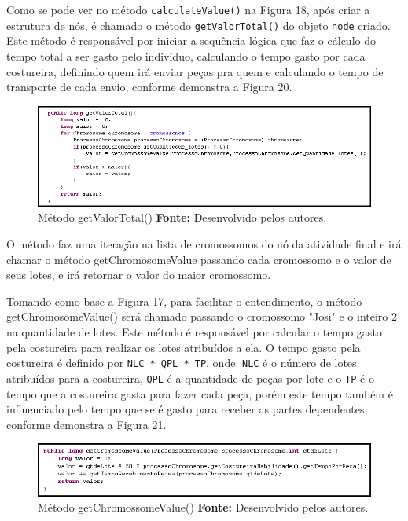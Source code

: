 \par Como se pode ver no método \texttt{calculateValue()} na Figura 18, após
criar a estrutura de nós, é chamado o método \texttt{getValorTotal()} do objeto
\texttt{node} criado. Este método é responsável por iniciar a sequência lógica que faz o cálculo do tempo total a ser gasto pelo indivíduo, calculando o tempo gasto por cada costureira, definindo quem irá enviar
peças pra quem e calculando o tempo de transporte de cada envio, conforme
demonstra a Figura 20.

\begin{figure}[h!]
	\centerline{\includegraphics[scale=0.7]{./imagens/metodo_getValorTotal.png}}
	\caption[Método getValorTotal()]
	{Método getValorTotal() \textbf{Fonte:} Desenvolvido pelos autores.}
	\label{fig:exemplo1}
\end{figure}

\par O método faz uma iteração na lista de cromossomos do nó da atividade final e irá chamar o método getChromosomeValue passando 
cada cromossomo e o valor de seus lotes, e irá retornar o valor do maior cromossomo.

\par Tomando como base a Figura 17, para facilitar o entendimento, o método
getChromosomeValue() será chamado passando o cromossomo "Josi" e o inteiro 2 na quantidade de lotes. Este método é responsável por calcular o tempo gasto 
pela costureira para realizar os lotes atribuídos a ela. O tempo gasto pela
costureira é definido por \texttt{NLC * QPL * TP}, onde: \texttt{NLC} é o número
de lotes atribuídos para a costureira, \texttt{QPL} é a quantidade de peças por
lote e o \texttt{TP} é o tempo que a costureira gasta para fazer cada peça, 
porém este tempo também é influenciado pelo tempo que se é gasto para receber 
as partes dependentes, conforme demonstra a Figura 21.

\begin{figure}[h!]
	\centerline{\includegraphics[scale=0.8]{./imagens/metodo_getCromossomeValue.png}}
	\caption[Método getChromossomeValue()]
	{Método getChromossomeValue() \textbf{Fonte:} Desenvolvido pelos autores.}
	\label{fig:exemplo1}
\end{figure}

